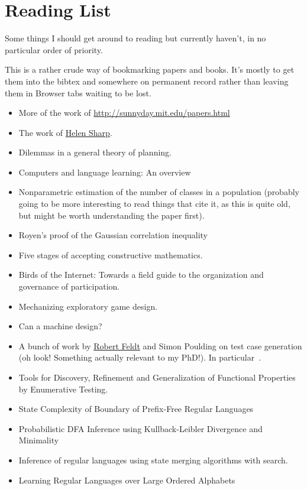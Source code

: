 \documentclass[a4paper]{book}
\begin{document}
\chapter{Reading List}

Some things I should get around to reading but currently haven't,
in no particular order of priority.

This is a rather crude way of bookmarking papers and books.
It's mostly to get them into the bibtex and somewhere on permanent record rather than leaving them in Browser tabs waiting to be lost.


\begin{itemize}
\item More of the work of \href{Nancy Leveson}{http://sunnyday.mit.edu/papers.html}
\item The work of \href{http://mcs.open.ac.uk/hcs2/}{Helen Sharp}.
\item Dilemmas in a general theory of planning\cite{rittel1973dilemmas}.
\item Computers and language learning: An overview\cite{warschauer1998computers}
\item Nonparametric estimation of the number of classes in a population\cite{chao1984nonparametric} (probably going to be more interesting to read things that cite it, as this is quite old, but might be worth understanding the paper first).
\item Royen’s proof of the Gaussian correlation inequality\cite{latala2017royen}
\item Five stages of accepting constructive mathematics\cite{bauer2017five}.
\item Birds of the Internet: Towards a field guide to the organization and governance of participation\cite{fish2011birds}.
\item Mechanizing exploratory game design\cite{smith2012mechanizing}.
\item Can a machine design?\cite{cross2001can}
\item A bunch of work by \href{http://www.robertfeldt.net/}{Robert Feldt} and Simon Poulding on test case generation
(oh look! Something actually relevant to my PhD!).
In particular~\cite{DBLP:conf/icst/PouldingF15, DBLP:conf/issre/FeldtP13, DBLP:conf/icse/FeldtP15}.
\item Tools for Discovery, Refinement and Generalization of Functional Properties by Enumerative Testing\cite{matela2017tools}.
\item State Complexity of Boundary of Prefix-Free Regular Languages\cite{DBLP:journals/ijfcs/EomH15}
\item Probabilistic DFA Inference using Kullback-Leibler Divergence and Minimality\cite{DBLP:conf/icml/ThollardDH00}
\item Inference of regular languages using state merging algorithms with search\cite{DBLP:journals/pr/BugalhoO05}.
\item Learning Regular Languages over Large Ordered Alphabets\cite{DBLP:journals/corr/MensM15}
\end{itemize}

{}

\end{document}
